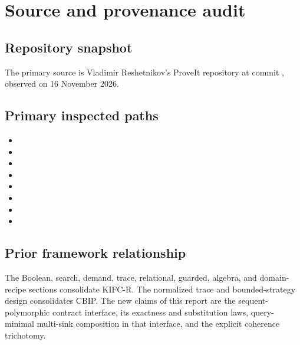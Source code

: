 \section{Source and provenance audit}

\subsection{Repository snapshot}
The primary source is Vladimir Reshetnikov's ProveIt repository at commit
, observed on 16 November 2026.

\subsection{Primary inspected paths}
\begin{itemize}
  \item {}
  \item {}
  \item {}
  \item {}
  \item {}
  \item {}
  \item {}
  \item {}
\end{itemize}

\subsection{Prior framework relationship}
The Boolean, search, demand, trace, relational, guarded, algebra, and domain-recipe sections consolidate KIFC-R.  The normalized trace and bounded-strategy design consolidates CBIP.  The new claims of this report are the sequent-polymorphic contract interface, its exactness and substitution laws, query-minimal multi-sink composition in that interface, and the explicit coherence trichotomy.

